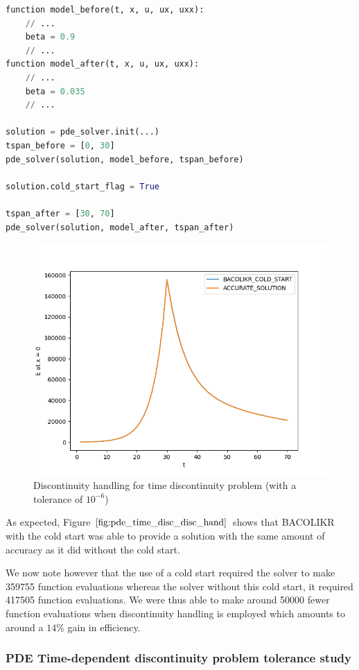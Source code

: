 \documentclass{article}
\begin{document}
\begin{minipage}{\linewidth}
\begin{lstlisting}[language=Python]
function model_before(t, x, u, ux, uxx):
	// ...
	beta = 0.9
	// ...
function model_after(t, x, u, ux, uxx):
	// ...
	beta = 0.035
	// ...

solution = pde_solver.init(...)
tspan_before = [0, 30]
pde_solver(solution, model_before, tspan_before)

solution.cold_start_flag = True

tspan_after = [30, 70]
pde_solver(solution, model_after, tspan_after)

\end{lstlisting}
\end{minipage}

\begin{figure}[H]
\centering
\includegraphics[width=0.7\linewidth]{./figures/pde_time_disc_disc_hand}
\caption{Discontinuity handling for time discontinuity problem (with a tolerance of $10^{-6}$)}
\label{fig:pde_time_disc_disc_hand}
\end{figure}

As expected, Figure $\ref{fig:pde_time_disc_disc_hand}$ shows that BACOLIKR with the cold start was able to provide a solution with the same amount of accuracy as it did without the cold start.

We now note however that the use of a cold start required the solver to make 359755 function evaluations whereas the solver without this cold start, it required 417505 function evaluations. We were thus able to make around 50000 fewer function evaluations when discontinuity handling is employed which amounts to around a $14\%$ gain in efficiency.

\subsubsection{PDE Time-dependent discontinuity problem tolerance study}
\label{subsubsection:pde_time_tol}
\end{document}
